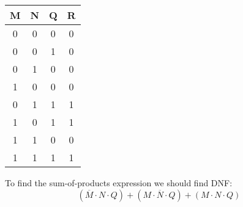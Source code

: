 \documentclass[a4paper]{article}
\begin{document}
  \begin{center}
            \begin{tabular}{|c|c|c||c|}
                \hline
                M&N&Q&R  \\
                \hline
                0&0&0&0  \\
                \hline
                0&0&1&0  \\
                \hline
                0&1&0&0  \\
                \hline
                1&0&0&0  \\
				\hline
                0&1&1&1  \\                
                \hline
                1&0&1&1  \\
                \hline
                1&1&0&0  \\
                \hline
                1&1&1&1  \\
                \hline
            \end{tabular}
        \end{center}
To find the sum-of-products expression we should find DNF: 
\begin{equation}
	(\overline{M} \cdot N \cdot Q) + (M \cdot \overline{N} \cdot Q) + (M \cdot N \cdot Q)
\end{equation}
\end{document}
